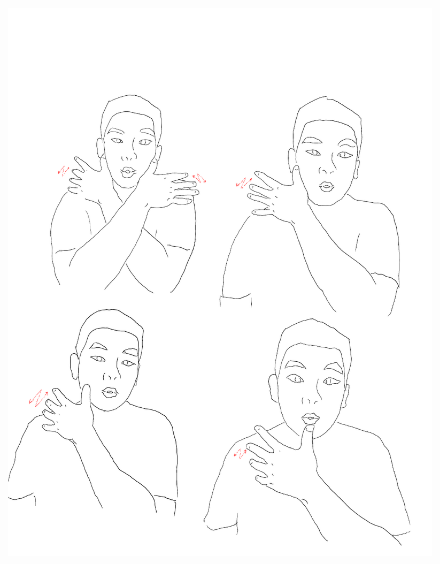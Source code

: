 \documentclass[12pt, a4paper, oneside]{ctexart}
\begin{document}
\begin{figure}[H]
{\begin{minipage}[t]{0.45\linewidth}
    \includegraphics[width=\linewidth]{fig/fish1.pdf}
    \end{minipage}%
    }%


\end{figure}
\end{document}
